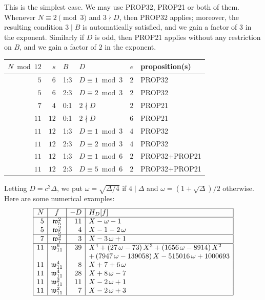 \documentclass[12pt,twoside,leqno]{article}
\numberwithin{equation}{section}
\newcommand{\w}{\mathfrak w}
\begin{document}
This is the simplest case. We may use PROP32, PROP21 or both
of them.
Whenever $N \equiv 2 \pmod 3$ and $3 \nmid D$, then PROP32 applies;
moreover, the resulting condition $3 \mid B$ is automatically satisfied,
and we gain a factor of $3$ in the exponent. Similarly if $D$ is odd,
then PROP21 applies without any restriction on $B$, and we gain a factor
of $2$ in the exponent.

\begin{center}
\begin{tabular}{|r|r||l|l||r||l|}\hline
$N \bmod {12}$ &  $s$ & $B$   & $D$               & $e$ & proposition(s) \\ \hline
$  5$          &  $6$ & 1:3 & $D\equiv 1\bmod 3$       & $2$ & PROP32 \\
$  5$          &  $6$ & 2:3 & $D\equiv 2\bmod 3$       & $2$ & PROP32 \\
\hline
$  7$          &  $4$ & 0:1   & $2 \nmid D$       & $2$ & PROP21 \\
\hline
$ 11$          & $12$ & 0:1   & $2 \nmid D$       & $6$ & PROP21 \\
$ 11$          & $12$ & 1:3 & $D\equiv 1\bmod 3$       & $4$ & PROP32 \\
$ 11$          & $12$ & 2:3 & $D\equiv 2\bmod 3$       & $4$ & PROP32 \\
$ 11$          & $12$ & 1:3 & $D\equiv 1\bmod 6$ & $2$ & PROP32+PROP21 \\
$ 11$          & $12$ & 2:3 & $D\equiv 5\bmod 6$ & $2$ & PROP32+PROP21 \\
\hline
\end{tabular}
\end{center}
Letting $D = c^2\Delta$, we put $\omega = \sqrt{\Delta/4}$ if $4 \mid
\Delta$ and $\omega = (1+\sqrt{\Delta})/2$ otherwise. Here are some
numerical examples:
$$\begin{array}{|r|c|r|l|}\hline
N & f & -D & H_{D}[f] \\ \hline
5 & \w_{5}^{2} & 11 &
X-\omega-1
\\
5 & \w_{5}^{2} & 4 &
X-1-2\,\omega
\\
\hline
7 & \w_{7}^{2} & 3 &
X-3\,\omega+1
\\
\hline
11 & \w_{11}^{6} & 39 &
{X}^{4}+ \left( 27\,\omega-73 \right) {X}^{3}+ \left( 1656\,\omega-
8914 \right) {X}^{2}\\
&&&+ \left( 7947\,\omega-139058 \right) X-515016\,
\omega+1000693
\\
11 & \w_{11}^{4} & 8 &
X+7+6\,\omega
\\
11 & \w_{11}^{4} & 28 &
X+8\,\omega-7
\\
11 & \w_{11}^{2} & 11 &
X-2\,\omega+1
\\
11 & \w_{11}^{2} & 7 &
X-2\,\omega+3
\\
\hline
\end{array}$$
\end{document}
